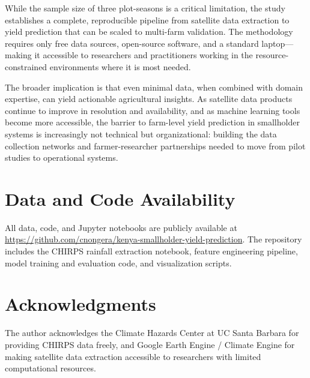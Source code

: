 \documentclass[11pt,a4paper]{article}
\begin{document}
While the sample size of three plot-seasons is a critical limitation, the study establishes a complete, reproducible pipeline from satellite data extraction to yield prediction that can be scaled to multi-farm validation. The methodology requires only free data sources, open-source software, and a standard laptop---making it accessible to researchers and practitioners working in the resource-constrained environments where it is most needed.

The broader implication is that even minimal data, when combined with domain expertise, can yield actionable agricultural insights. As satellite data products continue to improve in resolution and availability, and as machine learning tools become more accessible, the barrier to farm-level yield prediction in smallholder systems is increasingly not technical but organizational: building the data collection networks and farmer-researcher partnerships needed to move from pilot studies to operational systems.

\section*{Data and Code Availability}

All data, code, and Jupyter notebooks are publicly available at \url{https://github.com/cnongera/kenya-smallholder-yield-prediction}. The repository includes the CHIRPS rainfall extraction notebook, feature engineering pipeline, model training and evaluation code, and visualization scripts.

\section*{Acknowledgments}

The author acknowledges the Climate Hazards Center at UC Santa Barbara for providing CHIRPS data freely, and Google Earth Engine / Climate Engine for making satellite data extraction accessible to researchers with limited computational resources.
\end{document}
